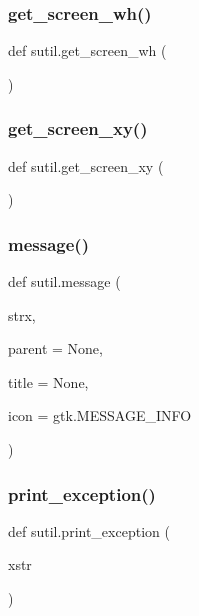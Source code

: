 \subsubsection{\texorpdfstring{get\+\_\+screen\+\_\+wh()}{get\_screen\_wh()}}
{\footnotesize\ttfamily def sutil.\+get\+\_\+screen\+\_\+wh (\begin{DoxyParamCaption}{ }\end{DoxyParamCaption})}

\mbox{\label{namespacesutil_a70f48a37a4146473048aa0cc60885a7d}} 
\subsubsection{\texorpdfstring{get\+\_\+screen\+\_\+xy()}{get\_screen\_xy()}}
{\footnotesize\ttfamily def sutil.\+get\+\_\+screen\+\_\+xy (\begin{DoxyParamCaption}{ }\end{DoxyParamCaption})}

\mbox{\label{namespacesutil_a55329686e169a9e2c0e28cef5dd6b280}} 
\subsubsection{\texorpdfstring{message()}{message()}}
{\footnotesize\ttfamily def sutil.\+message (\begin{DoxyParamCaption}\item[{}]{strx,  }\item[{}]{parent = {\ttfamily None},  }\item[{}]{title = {\ttfamily None},  }\item[{}]{icon = {\ttfamily gtk.MESSAGE\+\_\+INFO} }\end{DoxyParamCaption})}

\mbox{\label{namespacesutil_ac2f54c225674ebc1e9db28d0af8b31e6}} 
\subsubsection{\texorpdfstring{print\+\_\+exception()}{print\_exception()}}
{\footnotesize\ttfamily def sutil.\+print\+\_\+exception (\begin{DoxyParamCaption}\item[{}]{xstr }\end{DoxyParamCaption})}

